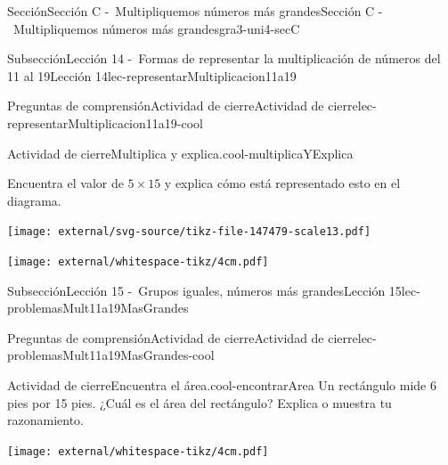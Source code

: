 \begin{sectionptx}{Sección}{Sección C -~Multipliquemos números más grandes}{}{Sección C -~Multipliquemos números más grandes}{}{}{gra3-uni4-secC}
\begin{subsectionptx}{Subsección}{Lección 14 -~Formas de representar la multiplicación de números del 11 al 19}{}{Lección 14}{}{}{lec-representarMultiplicacion11a19}
%
%
\typeout{************************************************}
\typeout{************************************************}
%
\begin{reading-questions-subsubsection-numberless}{Preguntas de comprensión}{Actividad de cierre}{}{Actividad de cierre}{}{}{lec-representarMultiplicacion11a19-cool}
\begin{project}{Actividad de cierre}{Multiplica y explica.}{cool-multiplicaYExplica}%
\begin{sidebyside}{2}{0}{0}{0}%
\begin{sbspanel}{0.6}%
Encuentra el valor de \(5\times 15\) y explica cómo está representado esto en el diagrama.%
\end{sbspanel}%
\begin{sbspanel}{0.4}%
\texttt{[image: external/svg-source/tikz-file-147479-scale13.pdf]}
\end{sbspanel}%
\end{sidebyside}%
\begin{image}{0}{1}{0}{}%
\texttt{[image: external/whitespace-tikz/4cm.pdf]}
\end{image}%
\end{project}%
\end{reading-questions-subsubsection-numberless}
\end{subsectionptx}
%
%
\typeout{************************************************}
\typeout{************************************************}
%
\begin{subsectionptx}{Subsección}{Lección 15 -~Grupos iguales, números más grandes}{}{Lección 15}{}{}{lec-problemasMult11a19MasGrandes}
%
%
\typeout{************************************************}
\typeout{************************************************}
%
\begin{reading-questions-subsubsection-numberless}{Preguntas de comprensión}{Actividad de cierre}{}{Actividad de cierre}{}{}{lec-problemasMult11a19MasGrandes-cool}
\begin{project}{Actividad de cierre}{Encuentra el área.}{cool-encontrarArea}%
Un rectángulo mide 6 pies por 15 pies. ¿Cuál es el área del rectángulo? Explica o muestra tu razonamiento.%
\begin{image}{0}{1}{0}{}%
\texttt{[image: external/whitespace-tikz/4cm.pdf]}
\end{image}%
\end{project}%

\end{reading-questions-subsubsection-numberless}
\end{subsectionptx}
\end{sectionptx}

